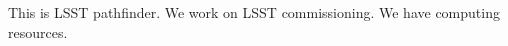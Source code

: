 \documentclass[11pt]{article}
\begin{document}
% 



% 
% 
%

\otherfacilities

This is LSST pathfinder. We work on LSST commissioning. We have computing resources.


%
%
%
%
%
\end{document}
